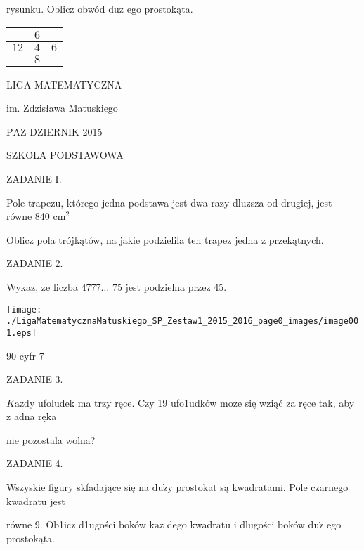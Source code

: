 \documentclass[a4paper,12pt]{article}
\begin{document}
rysunku. Oblicz obwód $\mathrm{d}\mathrm{u}\dot{\mathrm{z}}$ ego prostokąta.
\begin{center}
\begin{tabular}{|l|l|l|}
\hline
\multicolumn{1}{|l|}{}&	\multicolumn{1}{|l|}{$6$}&	\multicolumn{1}{|l|}{}	\\
\hline
\multicolumn{1}{|l|}{ $12$}&	\multicolumn{1}{|l|}{ $4$}&	\multicolumn{1}{|l|}{ $6$}	\\
\hline
\multicolumn{1}{|l|}{}&	\multicolumn{1}{|l|}{ $8$}&	\multicolumn{1}{|l|}{}	\\
\hline
\end{tabular}

\end{center}





LIGA MATEMATYCZNA

im. Zdzisława Matuskiego

$\mathrm{P}\mathrm{A}\dot{\mathrm{Z}}$ DZIERNIK 2015

SZKOLA PODSTAWOWA

ZADANIE I.

Pole trapezu, którego jedna podstawa jest dwa razy dluzsza od drugiej, jest równe 840 $\mathrm{c}\mathrm{m}^{2}$

Oblicz pola trójkątów, na jakie podzielila ten trapez jedna z przekątnych.

ZADANIE 2.

Wykaz, $\dot{\mathrm{z}}\mathrm{e}$ liczba 4777$\ldots$ 75 jest podzielna przez 45.
\begin{center}
\texttt{[image: ./LigaMatematycznaMatuskiego\_SP\_Zestaw1\_2015\_2016\_page0\_images/image001.eps]}
\end{center}
90 cyfr 7

ZADANIE 3.

$K\mathrm{a}\dot{\mathrm{z}}\mathrm{d}\mathrm{y}$ ufoludek ma trzy ręce. Czy 19 ufo1udków $\mathrm{m}\mathrm{o}\dot{\mathrm{z}}\mathrm{e}$ się wziąć za ręce tak, aby $\dot{\mathrm{z}}$ adna ręka

nie pozostala wolna?

ZADANIE 4.

Wszyskie figury skfadające się na $\mathrm{d}\mathrm{u}\dot{\mathrm{z}}\mathrm{y}$ prostokat są kwadratami. Pole czarnego kwadratu jest

równe 9. Ob1icz d1ugości boków $\mathrm{k}\mathrm{a}\dot{\mathrm{z}}$ dego kwadratu i dlugości boków $\mathrm{d}\mathrm{u}\dot{\mathrm{z}}$ ego prostokąta.
\end{document}
